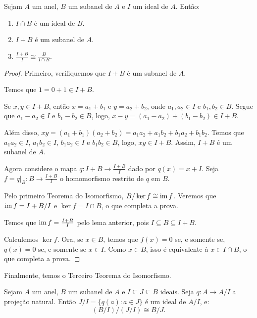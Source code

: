 \begin{theorem}
    Sejam $A$ um anel, $B$ um subanel de $A$ e $I$ um ideal de $A$. Então:

    \begin{enumerate}[label=\alph*)]
        \item $I\cap B$ é um ideal de $B$.
        \item $I+B$ é um subanel de $A$.
        \item $\displaystyle \frac{I+B}{I}\cong \frac{B}{I\cap B}$.
    
    \end{enumerate}
\end{theorem}

\begin{proof}
    Primeiro, verifiquemos que $I+B$ é um subanel de $A$.

    Temos que $1=0+1 \in I+B$.

    Se $x, y \in I+B$, então $x=a_1+b_1$ e $y=a_2+b_2$, onde $a_1, a_2 \in I$ e $b_1, b_2 \in B$.
    Segue que $a_1-a_2 \in I$ e $b_1-b_2 \in B$, logo, $x-y=(a_1-a_2)+(b_1-b_2) \in I+B$.

    Além disso, $xy=(a_1+b_1)(a_2+b_2)=a_1a_2+a_1b_2+b_1a_2+b_1b_2$.
    Temos que $a_1a_2\in I$, $a_1b_2\in I$, $b_1a_2\in I$ e $b_1b_2\in B$, logo, $xy\in I+B$.
    Assim, $I+B$ é um subanel de $A$.

    Agora considere o mapa $q:I+B\rightarrow \frac{I+B}{I}$ dado por $q(x)=x+I$. Seja $f=q|_B:B\rightarrow \frac{I+B}{I}$ o homomorfismo restrito de $q$ em $B$.

    Pelo primeiro Teorema do Isomorfismo, $B/\ker f \cong \operatorname{im} f$.
    Veremos que $\operatorname{im} f=I+B/I$ e $\ker f=I\cap B$, o que completa a prova.

    Temos que $\operatorname{im} f = \frac{I+B}{I}$ pelo lema anterior, pois $I\subseteq B\subseteq I+B$.

    Calculemos $\ker f$. Ora, se $x \in B$, temos que $f(x)=0$ se, e somente se, $q(x)=0$ se, e somente se $x\in I$.
    Como $x\in B$, isso é equivalente à $x \in I\cap B$, o que completa a prova.
\end{proof}
Finalmente, temos o Terceiro Teorema do Isomorfismo.
\begin{theorem}
    Sejam $A$ um anel, $B$ um subanel de $A$ e $I\subseteq J\subseteq B$ ideais.
    Seja $q:A\rightarrow A/I$ a projeção natural.
    Então $J/I=\{q(a):a \in J\}$ é um ideal de $A/I$, e:
    \[
         (B/I)/(J/I) \cong B/J.
    \]
\end{theorem}
